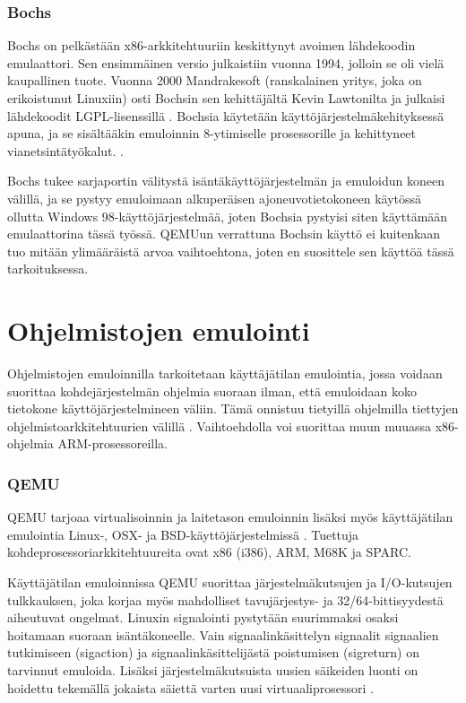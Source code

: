 \subsubsection{Bochs}

Bochs on pelkästään x86-arkkitehtuuriin keskittynyt avoimen lähdekoodin emulaattori. Sen ensimmäinen versio julkaistiin vuonna 1994, jolloin se oli vielä kaupallinen tuote. Vuonna 2000 Mandrakesoft (ranskalainen yritys, joka on erikoistunut Linuxiin) osti Bochsin sen kehittäjältä Kevin Lawtonilta ja julkaisi lähdekoodit LGPL-lisenssillä \cite{bochs0}. Bochsia käytetään käyttöjärjestelmäkehityksessä apuna, ja se sisältääkin emuloinnin 8-ytimiselle prosessorille ja kehittyneet vianetsintätyökalut. \cite{bochs_doc}.

Bochs tukee sarjaportin välitystä isäntäkäyttöjärjestelmän ja emuloidun koneen välillä, ja se pystyy emuloimaan alkuperäisen ajoneuvotietokoneen käytössä ollutta Windows 98-käyttöjärjestelmää, joten Bochsia pystyisi siten käyttämään emulaattorina tässä työssä. QEMUun verrattuna Bochsin käyttö ei kuitenkaan tuo mitään ylimääräistä arvoa vaihtoehtona, joten en suosittele sen käyttöä tässä tarkoituksessa.


\section{Ohjelmistojen emulointi}

Ohjelmistojen emuloinnilla tarkoitetaan käyttäjätilan emulointia, jossa voidaan suorittaa kohdejärjestelmän ohjelmia suoraan ilman, että emuloidaan koko tietokone käyttöjärjestelmineen väliin. Tämä onnistuu tietyillä ohjelmilla tiettyjen ohjelmistoarkkitehtuurien välillä \cite{tinycc, qemu_use}. Vaihtoehdolla voi suorittaa muun muuassa x86-ohjelmia ARM-prosessoreilla.

\subsubsection{QEMU}
QEMU tarjoaa virtualisoinnin ja laitetason emuloinnin lisäksi myös käyttäjätilan emulointia Linux-, OSX- ja BSD-käyttöjärjestelmissä \cite{qemu_use}. Tuettuja kohdeprosessoriarkkitehtuureita ovat x86 (i386), ARM, M68K ja SPARC.

Käyttäjätilan emuloinnissa QEMU suorittaa järjestelmäkutsujen ja I/O-kutsujen tulkkauksen, joka korjaa myös mahdolliset tavujärjestys- ja 32/64-bittisyydestä aiheutuvat ongelmat. Linuxin signalointi pystytään suurimmaksi osaksi hoitamaan suoraan isäntäkoneelle. Vain signaalinkäsittelyn signaalit signaalien tutkimiseen (sigaction) ja signaalinkäsittelijästä poistumisen (sigreturn) on tarvinnut emuloida. Lisäksi järjestelmäkutsuista uusien säikeiden luonti on hoidettu tekemällä jokaista säiettä varten uusi virtuaaliprosessori \cite{qemu_tech}.

